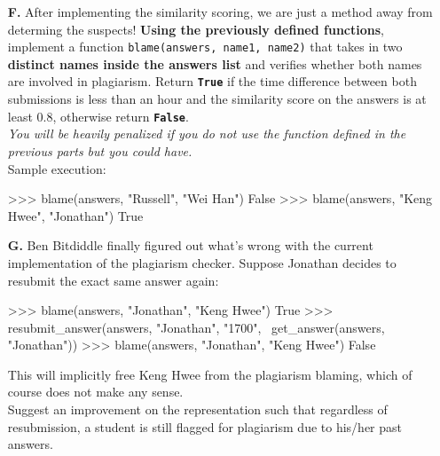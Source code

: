 \begin{enumerate}
\item[\textbf{F.}]
After implementing the similarity scoring, we are just a method away from determing the suspects! \textbf{Using the previously defined functions}, 
implement a function \colorbox{CornflowerBlue!20}{\texttt{blame(answers, name1, name2)}} that takes in two \textbf{distinct names inside the answers list} and verifies 
whether both names are involved in plagiarism. Return \texttt{\bfseries True} if the time difference between both submissions is less than an hour and the similarity 
score on the answers is at least 0.8, otherwise return \texttt{\bfseries False}. \\
\textit{You will be heavily penalized if you do not use the function defined in the previous parts but you could have.} \\
Sample execution:
\begin{python}
>>> blame(answers, "Russell", "Wei Han")
False
>>> blame(answers, "Keng Hwee", "Jonathan")
True
\end{python}
\begin{flushright}
    [6 marks]
\end{flushright}

\item[\textbf{G.}]
Ben Bitdiddle finally figured out what's wrong with the current implementation of the plagiarism checker. Suppose Jonathan decides to resubmit 
the exact same answer again:
\begin{python}
>>> blame(answers, "Jonathan", "Keng Hwee")
True
>>> resubmit_answer(answers, "Jonathan", "1700", \
        get_answer(answers, "Jonathan"))
>>> blame(answers, "Jonathan", "Keng Hwee")
False
\end{python}
This will implicitly free Keng Hwee from the plagiarism blaming, which of course does not make any sense. \\
Suggest an improvement on the representation such that regardless of resubmission, a student is still flagged for plagiarism due to his/her 
past answers.
\begin{flushright}
    [4 marks]
\end{flushright}
\end{enumerate}

\newpage
